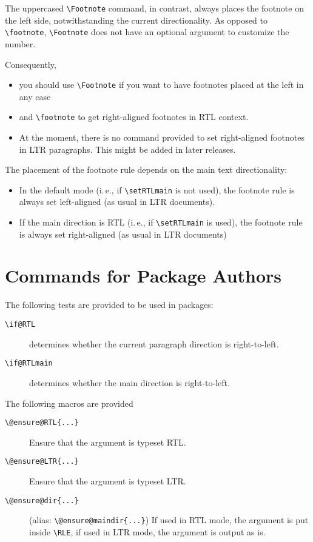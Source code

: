 \documentclass{article}
\newcommand*{\cmd}[1]{\texttt{\textbackslash #1}}
\begin{document}
The uppercased \cmd{Footnote} command, in contrast, always places the footnote on the left side, notwithstanding the current
directionality. As opposed to \cmd{footnote}, \cmd{Footnote} does not have an optional argument to customize the number.

Consequently,
\begin{itemize}
	\item you should use \cmd{Footnote} if you want to have footnotes placed at the left in any case
	\item and \cmd{footnote} to get right-aligned footnotes in RTL context.
	\item At the moment, there is no command provided to set right-aligned footnotes in LTR paragraphs.
	This might be added in later releases.
\end{itemize}
%
The placement of the footnote rule depends on the main text directionality:

\begin{itemize}
	\item In the default mode (i.\,e., if \cmd{setRTLmain} is not used), the footnote rule is always set left-aligned (as usual in LTR documents).
	\item If the main direction is RTL (i.\,e., if \cmd{setRTLmain} is used), the footnote rule is always set right-aligned (as usual in LTR documents)
\end{itemize}



\section{Commands for Package Authors}

The following tests are provided to be used in packages:

\begin{description}
	\item[\cmd{if@RTL}] determines whether the current paragraph direction is right-to-left.
	\item[\cmd{if@RTLmain}] determines whether the main direction is right-to-left.
\end{description}
%
The following macros are provided
\begin{description}
	\item[\cmd{@ensure@RTL\{...\}}] Ensure that the argument is typeset RTL.
	\item[\cmd{@ensure@LTR\{...\}}] Ensure that the argument is typeset LTR.
	\item[\cmd{@ensure@dir\{...\}}] (alias: \cmd{@ensure@maindir\{...\}}) If used in RTL mode, the argument is put inside \cmd{RLE}, if used in LTR mode, the argument is output as is.
\end{description}
\end{document}
